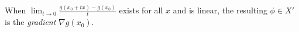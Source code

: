 When $\lim_{t\to0}\frac{g(x_0+tx)-g(x_0)}{t}$ exists for all $x$ and is linear, the resulting $\phi\in X'$ is the \emph{gradient} $\nabla g(x_0)$.
